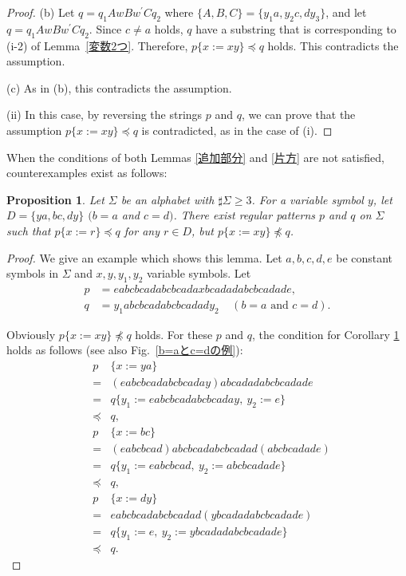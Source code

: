 \begin{proof}
\textrm{(b)}
Let $q=q_{1}AwBw^{\prime}Cq_{2}$ where $\{ A,B,C \} = \{ y_{1}a,y_{2}c,dy_{3} \}$, and let $q=q_{1}AwBw^{\prime}Cq_{2}$.
Since $c \not = a$ holds, $q$ have a substring that is corresponding to (i-2) of Lemma~\ref{変数2つ}.
Therefore, $p \{ x:= xy \} \preceq q$ holds.
This contradicts the assumption. 

\textrm{(c)} As in (b), this contradicts the assumption.

\noindent\textrm{(ii)}
In this case, by reversing the strings $p$ and $q$, we can prove that the assumption $p \{ x := xy \} \preceq q$ is contradicted, as in the case of \textrm{(i)}.
\end{proof}

When the conditions of both Lemmas \ref{追加部分} and \ref{片方} are not satisfied, counterexamples exist as follows:

\newtheorem{prop}{Proposition}

\begin{prop}\label{両方}
  Let $\Sigma$ be an alphabet with $\sharp \Sigma \ge 3$.
  For a variable symbol $y$, let $D= \{ ya, bc, dy \}$ $(b = a$ and $c = d)$. There exist regular patterns $p$ and $q$ on $\Sigma$ such that $p \{ x := r \} \preceq q$ for any $r \in D$, but $p \{ x := xy \} \not \preceq q$.
\end{prop}

\begin{proof}
We give an example which shows this lemma.
Let $a,b,c,d,e$ be constant symbols in $\Sigma$ and 
$x,y,y_{1},y_{2}$ variable symbols.
Let 
\begin{align*}
p &= eabcbcadabcbcadaxbcadadabcbcadade,\\
q &= y_{1}abcbcadabcbcadady_{2}~~~~~(b = a\mbox{~and~}c = d).
\end{align*}

\noindent
Obviously $p \{ x:=xy \} \not \preceq q$ holds.
For these $p$ and $q$, the condition for Corollary \ref{両方} holds as follows (see also Fig.~\ref{b=aとc=dの例}):
\begin{eqnarray*}
&p& \{ x:=ya \} \\ 
& = & (eabcbcadabcbcaday)abcadadabcbcadade\\
& = & q \{ y_{1} := eabcbcadabcbcaday,~y_{2}:=e \} \\
& \preceq & q,\\
&p& \{ x:=bc \}  \\
& = & (eabcbcad)abcbcadabcbcadad(abcbcadade) \\
& = & q \{ y_{1} := eabcbcad,~y_{2} := abcbcadade \} \\
& \preceq & q,\\
&p& \{ x:=dy \}  \\
& = & eabcbcadabcbcadad(ybcadadabcbcadade) \\
& = & q \{ y_{1}:=e,~y_{2} := ybcadadabcbcadade \} \\
& \preceq & q.
\end{eqnarray*}
\end{proof}

